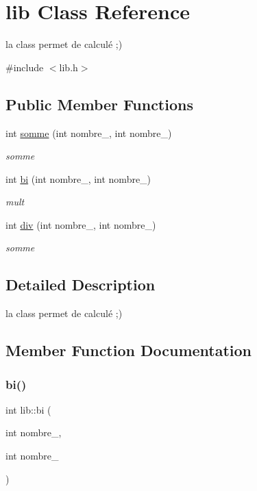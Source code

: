 \hypertarget{classlib}{}\section{lib Class Reference}
\label{classlib}


la class permet de calculé ;)  




{\ttfamily \#include $<$lib.\+h$>$}

\subsection*{Public Member Functions}
\begin{DoxyCompactItemize}
\item 
int \hyperlink{classlib_a3ac2a339fc371a6d8e6f7fd1bf21e3da}{somme} (int nombre\+\_, int nombre\+\_)
\begin{DoxyCompactList}\small\item\em somme \end{DoxyCompactList}\item 
int \hyperlink{classlib_a86012a066fe501a323296e9502366c24}{bi} (int nombre\+\_, int nombre\+\_)
\begin{DoxyCompactList}\small\item\em mult \end{DoxyCompactList}\item 
int \hyperlink{classlib_a6fbc4f750800b874e00243d883502011}{div} (int nombre\+\_, int nombre\+\_)
\begin{DoxyCompactList}\small\item\em somme \end{DoxyCompactList}\end{DoxyCompactItemize}


\subsection{Detailed Description}
la class permet de calculé ;) 

\subsection{Member Function Documentation}
\mbox{\label{classlib_a86012a066fe501a323296e9502366c24}} 
\subsubsection{\texorpdfstring{bi()}{bi()}}
{\footnotesize\ttfamily int lib\+::bi (\begin{DoxyParamCaption}\item[{int}]{nombre\+\_,  }\item[{int}]{nombre\+\_ }\end{DoxyParamCaption})}



